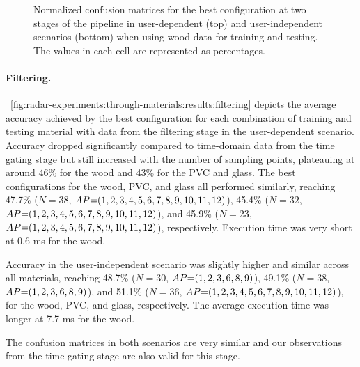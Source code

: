 \begin{figure}[!t]
    \caption{Normalized confusion matrices for the best configuration at two stages of the pipeline in user-dependent (top) and user-independent scenarios (bottom) when using wood data for training and testing. The values in each cell are represented as percentages.}
    \label{fig:radar-experiments:through-materials:wood-confusion}
\end{figure}

\paragraph{Filtering.}
\fig~\ref{fig:radar-experiments:through-materials:results:filtering} depicts the average accuracy achieved by the best configuration for each combination of training and testing material with data from the filtering stage in the user-dependent scenario.
%
Accuracy dropped significantly compared to time-domain data from the time gating stage but still increased with the number of sampling points, plateauing at around 46\% for the wood and 43\% for the PVC and glass.
The best configurations for the wood, PVC, and glass all performed similarly, reaching 47.7\% ($N{=}38$, $\splitatcommas{AP{=}(1, 2, 3, 4, 5, 6, 7, 8, 9, 10, 11, 12)}$), 45.4\% ($N{=}32$, $\splitatcommas{AP{=}(1, 2, 3, 4, 5, 6, 7, 8, 9, 10, 11, 12)}$), and 45.9\% ($N{=}23$, $\splitatcommas{AP{=}(1, 2, 3, 4, 5, 6, 7, 8, 9, 10, 11, 12)}$), respectively. Execution time was very short at 0.6 ms for the wood.

Accuracy in the user-independent scenario was slightly higher and similar across all materials, reaching 48.7\% ($N{=}30$, $\splitatcommas{AP{=}(1, 2, 3, 6, 8, 9)}$), 49.1\% ($N{=}38$, $\splitatcommas{AP{=}(1, 2, 3, 6, 8, 9)}$), and 51.1\% ($N{=}36$, $\splitatcommas{AP{=}(1, 2, 3, 4, 5, 6, 7, 8, 9, 10, 11, 12)}$), for the wood, PVC, and glass, respectively. The average execution time was longer at 7.7 ms for the wood.

The confusion matrices in both scenarios are very similar and our observations from the time gating stage are also valid for this stage. 




